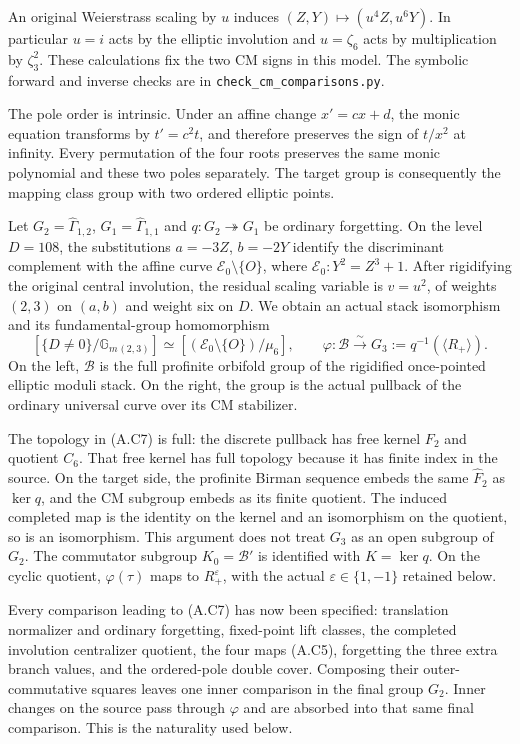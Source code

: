An original Weierstrass scaling by $u$ induces
$(Z,Y)\mapsto(u^4Z,u^6Y)$. In particular $u=i$ acts by the elliptic
involution and $u=\zeta_6$ acts by multiplication by $\zeta_3^2$.
These calculations fix the two CM signs in this model. The symbolic
forward and inverse checks are in \texttt{check\_cm\_comparisons.py}.

The pole order is intrinsic. Under an affine change $x'=cx+d$, the
monic equation transforms by $t'=c^2t$, and therefore preserves the
sign of $t/x^2$ at infinity. Every permutation of the four roots
preserves the same monic polynomial and these two poles separately.
The target group is consequently the mapping class group with two
ordered elliptic points.

Let $G_2=\widehat\Gamma_{1,2}$, $G_1=\widehat\Gamma_{1,1}$ and
$q:G_2\twoheadrightarrow G_1$ be ordinary forgetting. On the level
$D=108$, the substitutions $a=-3Z$, $b=-2Y$ identify the
discriminant complement with the affine curve
$\mathcal E_0\setminus\{O\}$, where $\mathcal E_0:Y^2=Z^3+1$.
After rigidifying the original central involution, the residual
scaling variable is $v=u^2$, of weights $(2,3)$ on $(a,b)$ and
weight six on $D$. We obtain an actual stack isomorphism and its
fundamental-group homomorphism
\[
 \left[\{D\ne0\}/\mathbb G_m{}_{(2,3)}\right]
   \simeq[(\mathcal E_0\setminus\{O\})/\mu_6],
 \qquad
 \varphi:\mathcal B\xrightarrow{\sim}
       G_3:=q^{-1}(\langle R_+\rangle).
 \tag{A.C7}
\]
On the left, $\mathcal B$ is the full profinite orbifold group of
the rigidified once-pointed elliptic moduli stack. On the right,
the group is the actual pullback of the ordinary universal curve
over its CM stabilizer.

The topology in (A.C7) is full: the discrete pullback has free kernel
$F_2$ and quotient $C_6$. That free kernel has full topology because
it has finite index in the source. On the target side, the profinite
Birman sequence embeds the same $\widehat F_2$ as $\ker q$, and the
CM subgroup embeds as its finite quotient. The induced completed
map is the identity on the kernel and an isomorphism on the quotient,
so is an isomorphism. This argument does not treat $G_3$ as an open
subgroup of $G_2$. The commutator subgroup $K_0=\mathcal B'$ is
identified with $K=\ker q$. On the cyclic quotient,
$\varphi(\tau)$ maps to $R_+^{\varepsilon}$, with the actual
$\varepsilon\in\{1,-1\}$ retained below.

Every comparison leading to (A.C7) has now been specified:
translation normalizer and ordinary forgetting, fixed-point lift
classes, the completed involution centralizer quotient, the four
maps (A.C5), forgetting the three extra branch values, and the
ordered-pole double cover. Composing their outer-commutative squares
leaves one inner comparison in the final group $G_2$. Inner changes
on the source pass through $\varphi$ and are absorbed into that
same final comparison. This is the naturality used below.

